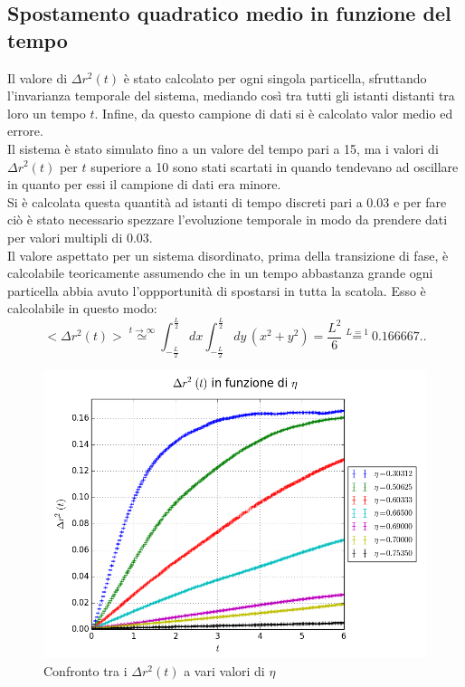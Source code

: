 \subsection{Spostamento quadratico medio in funzione del tempo}
Il valore di $\Delta r^2(t)$ è stato calcolato per ogni singola particella, sfruttando l'invarianza temporale del sistema, mediando così tra tutti gli istanti distanti tra loro un tempo $t$. Infine, da questo campione di dati si è calcolato valor medio ed errore.\\
Il sistema è stato simulato fino a un valore del tempo pari a 15, ma i valori di $\Delta r^2(t)$ per $t$ superiore a 10 sono stati scartati in quando tendevano ad oscillare in quanto per essi il campione di dati era minore.\\
Si è calcolata questa quantità ad istanti di tempo discreti pari a 0.03 e per fare ciò è stato necessario spezzare l'evoluzione temporale in modo da prendere dati per valori multipli di 0.03.\\
Il valore aspettato per un sistema disordinato, prima della transizione di fase, è calcolabile teoricamente assumendo che in un tempo abbastanza grande ogni particella abbia avuto l'oppportunità di spostarsi in tutta la scatola. Esso è calcolabile in questo modo:
$$
<\Delta r^2(t)> \overset{\mathit{t\rightarrow \infty}}{\simeq} \int_{-\frac{L}{2}}^{\frac{L}{2}} dx \int_{-\frac{L}{2}}^{\frac{L}{2}}dy \, (x^2 + y^2 )= \frac{L^2}{6} \overset{\mathit{L=1}}{=} 0.166667..
$$
\begin{center}
	\begin{figure}[h]
	\centering
		\includegraphics[scale=0.5]{sfere2D/dr2vari.png}
	\caption{Confronto tra i $\Delta r^2(t)$ a vari valori di $\eta$}
	\end{figure}
\end{center}
